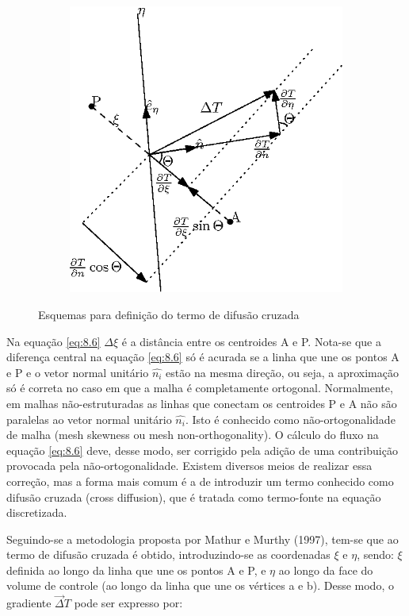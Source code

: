 \begin{figure}[ht]
    \begin{subfigure}{.5\textwidth}
        \centering
        \includegraphics[width=.8\linewidth]{fig/difusao-cruzada-c.eps}
        \caption{}
        \label{fig:8.1-c}
    \end{subfigure}

    \caption{Esquemas para definição do termo de difusão cruzada}
    \label{fig:8.1}
\end{figure}

Na equação \ref{eq:8.6} $\Delta \xi$ é a distância entre os centroides A e P. Nota-se que a diferença central na equação \ref{eq:8.6} só é acurada se a linha que une os pontos A e P e o vetor normal unitário $\hat{n_i}$ estão na mesma direção, ou seja, a aproximação só é correta no caso em que a malha é completamente ortogonal. Normalmente, em malhas não-estruturadas as linhas que conectam os centroides P e A não são paralelas ao vetor normal unitário $\hat{n_i}$. Isto é conhecido como não-ortogonalidade de malha (mesh skewness ou mesh non-orthogonality). O cálculo do fluxo na equação \ref{eq:8.6} deve, desse modo, ser corrigido pela adição de uma contribuição provocada pela não-ortogonalidade. Existem diversos meios de realizar essa correção, mas a forma mais comum é a de introduzir um termo conhecido como difusão cruzada (cross diffusion), que é tratada como termo-fonte na equação discretizada.

Seguindo-se a metodologia proposta por Mathur e Murthy (1997), tem-se que ao termo de difusão cruzada é obtido, introduzindo-se as coordenadas $\xi$ e $\eta$, sendo: $\xi$ definida ao longo da linha que une os pontos A e P, e $\eta$ ao longo da face do volume de controle (ao longo da linha que une os vértices a e b). Desse modo, o gradiente $\vec{\Delta}T$ pode ser expresso por:

